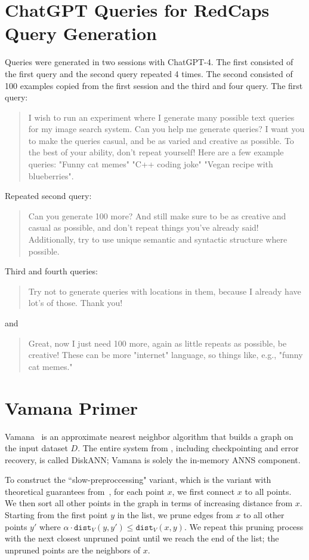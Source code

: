 \documentclass{article}
\theoremstyle{plain}
\theoremstyle{definition}
\theoremstyle{remark}
\begin{document}
\section{ChatGPT Queries for RedCaps Query Generation}
\label{app:redcaps_gpt}
Queries were generated in two sessions with ChatGPT-4. The first consisted of the first query and the second query repeated 4 times. The second consisted of 100 examples copied from the first session and the third and four query. The first query:
\begin{quote}
I wish to run an experiment where I generate many possible text queries for my image search system. Can you help me generate queries? I want you to make the queries casual, and be as varied and creative as possible. To the best of your ability, don't repeat yourself! Here are a few example queries:
"Funny cat memes"
"C++ coding joke"
"Vegan recipe with blueberries".    
\end{quote}
Repeated second query:
\begin{quote}
    Can you generate 100 more? And still make sure to be as creative and casual as possible, and don't repeat things you've already said! Additionally, try to use unique semantic and syntactic structure where possible.
\end{quote}
Third and fourth queries:
\begin{quote}
    Try not to generate queries with locations in them, because I already have lot's of those. Thank you!
\end{quote}
and 
\begin{quote}
    Great, now I just need 100 more, again as little repeats as possible, be creative! These can be more "internet" language, so things like, e.g., "funny cat memes."
\end{quote}

\section{Vamana Primer}
\label{app:diskann}

Vamana~\cite{diskann} is an approximate nearest neighbor algorithm that builds a graph on the input dataset $D$. The entire system from \cite{diskann}, including checkpointing and error recovery, is called DiskANN; Vamana is solely the in-memory ANNS component.

To construct the ``slow-preproccessing" variant, which is the variant with theoretical guarantees from~\cite{indyk2023worst}, for each point $x$, we first connect $x$ to all points. We then sort all other points in the graph in terms of increasing distance from $x$. Starting from the first point $y$ in the list, we prune edges from $x$ to all other points $y'$ where $\alpha \cdot \texttt{dist}_V(y, y') \le \texttt{dist}_V(x, y)$. We repeat this pruning process with the next closest unpruned point until we reach the end of the list; the unpruned points are the neighbors of $x$.
\end{document}

